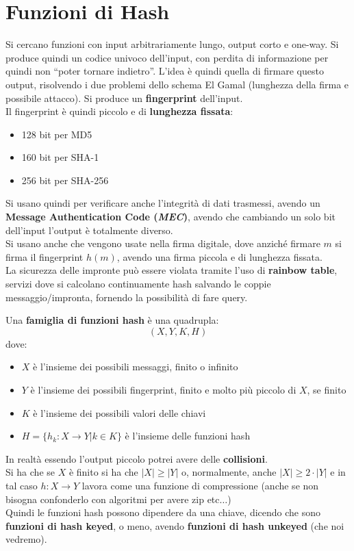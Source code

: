\documentclass[a4paper,12pt, oneside]{book}
\begin{document}
\section{Funzioni di Hash}
Si cercano funzioni con input arbitrariamente lungo, output corto e one-way. Si
produce quindi un codice univoco dell'input, con 
perdita di informazione per quindi non ``poter tornare indietro''. L'idea è
quindi quella di firmare questo output, risolvendo i due problemi dello schema
El Gamal (lunghezza della firma e possibile attacco). Si produce un
\textbf{fingerprint} dell'input.\\ 
Il fingerprint è quindi piccolo e di \textbf{lunghezza fissata}:
\begin{itemize}
  \item 128 bit per MD5
  \item 160 bit per SHA-1
  \item 256 bit per SHA-256
\end{itemize}
Si usano quindi per verificare anche l'integrità di dati trasmessi, avendo un
\textbf{Message Authentication Code (\textit{MEC})}, avendo che cambiando un
solo bit dell'input l'output è totalmente diverso.\\
Si usano anche che vengono usate nella firma digitale, dove anziché firmare $m$
si firma il fingerprint $h(m)$, avendo una firma piccola e di lunghezza
fissata.\\
La sicurezza delle impronte può essere violata tramite l'uso di \textbf{rainbow
  table}, servizi dove si calcolano continuamente hash salvando le coppie
messaggio/impronta, fornendo la possibilità di fare query.
\begin{definizione}
  Una \textbf{famiglia di funzioni hash} è una quadrupla:
  \[(X,Y,K,H)\]
  dove:
  \begin{itemize}
    \item $X$ è l'insieme dei possibili messaggi, finito o infinito
    \item $Y$ è l'insieme dei possibili fingerprint, finito e molto più piccolo
    di $X$, se finito
    \item $K$ è l'insieme dei possibili valori delle chiavi
    \item $H=\{h_k:X\to Y|k\in K\}$ è l'insieme delle funzioni hash
  \end{itemize}
  In realtà essendo l'output piccolo potrei avere delle \textbf{collisioni}. \\
  Si ha che se $X$ è finito si ha che $|X|\geq |Y|$ o, normalmente, anche
  $|X|\geq 2\cdot|Y|$ e in tal caso $h:X\to Y$ lavora come una funzione di
  compressione (anche se non bisogna confonderlo con algoritmi per avere zip
  etc$\ldots$)  \\ 
  Quindi le funzioni hash possono dipendere da una chiave, dicendo che sono
  \textbf{funzioni di hash keyed}, o meno, avendo  \textbf{funzioni di hash
    unkeyed} (che noi vedremo). 
\end{definizione}
\end{document}
